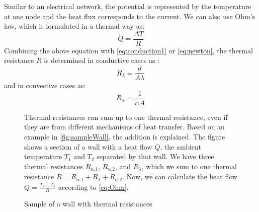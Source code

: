     Similar to an electrical network, the potential is represented by the temperature at one node and the heat flux corresponds to the current. We can also use Ohm's law, which is formulated in a thermal way as:  
     \begin{equation}
    \label{eq:Ohm}
        \dot{Q} = \frac{\Delta T}{R} 
    \end{equation}
    Combining the above equation with \autoref{eq:conduction1} or \autoref{eq:newton}, the thermal resistance $R$ is determined in conductive cases as \cite{Kuchling.2007}:
    \begin{equation}
    \label{eq:r_lambda}
        R_\lambda = \frac{d}{A\lambda}
    \end{equation}
   and in convective cases as\cite{Griesinger.2019}:
    \begin{equation}
        R_\alpha = \frac{1}{\alpha A}
    \end{equation}
    
    \begin{figure}[H]
    \begin{minipage}[t]{7cm}
    \vspace{0pt}
    Thermal resistances can sum up to one thermal resistance, even if they are from different mechanisms of heat transfer. Based on an example in \autoref{fig:sampleWall}, the addition is explained. The figure shows a section of a wall with a heat flow $\dot{Q}$, the ambient temperature $T_\text{1}$ and $T_\text{2}$ separated by that wall. We have three thermal resistances $R_{\alpha\text{,1}}$, $R_{\alpha\text{,2}}$, and $R_\lambda$, which we sum to one thermal resistance $R = R_{\alpha\text{,1}} + R_\lambda + R_{\alpha\text{,2}}$. Now, we can calculate the heat flow $\dot{Q}= \frac{T_\text{2}-T_\text{1}}{R} $ according to \autoref{eq:Ohm}.
    \end{minipage}
    \hfill
    \begin{minipage}[t]{7cm}
    \vspace{0pt}
    \centering
    
    \caption{Sample of a wall with thermal resistances}
    \label{fig:sampleWall}
    \end{minipage}
    \end{figure}
    
